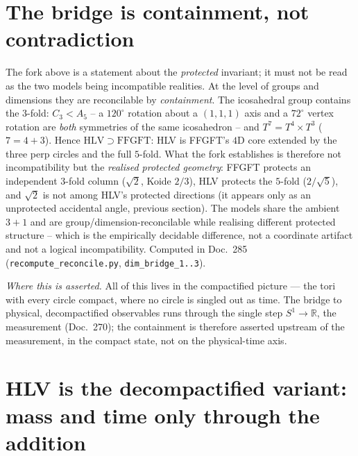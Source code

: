 \section{The bridge is containment, not contradiction}
The fork above is a statement about the \emph{protected} invariant; it must not be read as
the two models being incompatible realities. At the level of groups and dimensions they are
reconcilable by \emph{containment}. The icosahedral group contains the $3$-fold: $C_3<A_5$ --
a $120^\circ$ rotation about a $(1,1,1)$ axis and a $72^\circ$ vertex rotation are \emph{both}
symmetries of the same icosahedron -- and $T^7=T^4\times T^3$ ($7=4+3$). Hence
$\mathrm{HLV}\supset\mathrm{FFGFT}$: HLV is FFGFT's $4$D core extended by the three perp
circles and the full $5$-fold. What the fork establishes is therefore not incompatibility but
the \emph{realised protected geometry}: FFGFT protects an independent $3$-fold column
($\sqrt2$, Koide $2/3$), HLV protects the $5$-fold ($2/\sqrt5$), and $\sqrt2$ is not among
HLV's protected directions (it appears only as an unprotected accidental angle, previous
section). The models share the ambient $3{+}1$ and are group/dimension-reconcilable while
realising different protected structure -- which is the empirically decidable difference, not
a coordinate artifact and not a logical incompatibility. Computed in Doc.~285
(\texttt{recompute\_reconcile.py}, \texttt{dim\_bridge\_1..3}).

\medskip\noindent\emph{Where this is asserted.} All of this lives in the compactified picture --- the tori with every circle compact, where no circle is singled out as time. The bridge to physical, decompactified observables runs through the single step $S^1\to\mathbb{R}$, the measurement (Doc.~270); the containment is therefore asserted upstream of the measurement, in the compact state, not on the physical-time axis.

\section{HLV is the decompactified variant: mass and time only through the addition}

